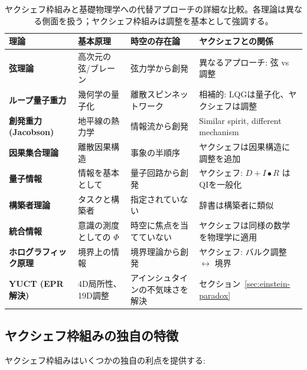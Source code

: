 \documentclass[11pt,a4paper]{article}
\begin{document}
	\begin{table}[htbp]
		\centering
		\scriptsize
	
			\begin{tabular}{p{}p{0.25\textwidth}p{}p{}}
				\toprule
				\textbf{理論} & \textbf{基本原理} & \textbf{時空の存在論} & \textbf{ヤクシェフとの関係} \\
				\midrule
				\textbf{弦理論} & 
				高次元の弦/ブレーン & 
				弦力学から創発 & 
				異なるアプローチ: 弦 vs 調整 \\
				\hline
				\textbf{ループ量子重力} & 
				幾何学の量子化 & 
				離散スピンネットワーク & 
				相補的: LQGは量子化、ヤクシェフは調整 \\
				\hline
				\textbf{創発重力 (Jacobson)} & 
				地平線の熱力学 & 
				情報流から創発 & 
				Similar spirit, different mechanism \\
				\hline
				\textbf{因果集合理論} & 
				離散因果構造 & 
				事象の半順序 & 
				ヤクシェフは因果構造に調整を追加 \\
				\hline
				\textbf{量子情報} & 
				情報を基本として & 
				量子回路から創発 & 
				ヤクシェフ: $D+I•R$ はQIを一般化 \\
				\hline
				\textbf{構築者理論} & 
				タスクと構築者 & 
				指定されていない & 
				辞書は構築者に類似 \\
				\hline
				\textbf{統合情報} & 
				意識の測度としての $\Phi$ & 
				時空に焦点を当てていない & 
				ヤクシェフは同様の数学を物理学に適用 \\
				\hline
				\textbf{ホログラフィック原理} & 
				境界上の情報 & 
				境界理論から創発 & 
				ヤクシェフ: バルク調整 $\leftrightarrow$ 境界 \\
				\hline
				\textbf{YUCT (EPR解決)} & 
				4D局所性、19D調整 & 
				アインシュタインの不気味さを解決 & 
				セクション~\ref{sec:einstein-paradox} \\
				\bottomrule
			\end{tabular}

		\caption{ヤクシェフ枠組みと基礎物理学への代替アプローチの詳細な比較。各理論は異なる側面を扱う；ヤクシェフ枠組みは調整を基本として強調する。}
	\end{table}
	
	\subsection{ヤクシェフ枠組みの独自の特徴}
	
	ヤクシェフ枠組みはいくつかの独自の利点を提供する:
	
\end{document}
